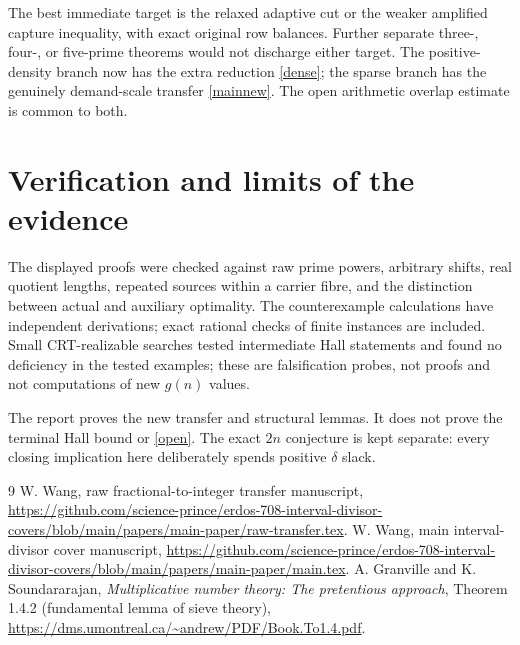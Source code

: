 \documentclass[11pt,a4paper]{article}
\begin{document}
The best immediate target is the relaxed adaptive cut or the weaker
amplified capture inequality, with exact original row balances. Further
separate three-, four-, or five-prime theorems would not discharge either
target. The positive-density branch now has the extra reduction
\eqref{dense}; the sparse branch has the genuinely demand-scale transfer
\eqref{mainnew}. The open arithmetic overlap estimate is common to both.

\section{Verification and limits of the evidence}

The displayed proofs were checked against raw prime powers, arbitrary shifts,
real quotient lengths, repeated sources within a carrier fibre, and the
distinction between actual and auxiliary optimality. The counterexample
calculations have independent derivations; exact rational checks of finite
instances are included. Small CRT-realizable searches tested intermediate
Hall statements and found no deficiency in the tested examples; these are
falsification probes, not proofs and not computations of new $g(n)$ values.

The report proves the new transfer and structural lemmas. It does not prove
the terminal Hall bound or \eqref{open}. The exact $2n$ conjecture is kept
separate: every closing implication here deliberately spends positive
$\delta$ slack.

\begin{thebibliography}{9}
 W. Wang, raw fractional-to-integer transfer manuscript,
\url{https://github.com/science-prince/erdos-708-interval-divisor-covers/blob/main/papers/main-paper/raw-transfer.tex}.
 W. Wang, main interval-divisor cover manuscript,
\url{https://github.com/science-prince/erdos-708-interval-divisor-covers/blob/main/papers/main-paper/main.tex}.
 A. Granville and K. Soundararajan,
\emph{Multiplicative number theory: The pretentious approach},
Theorem 1.4.2 (fundamental lemma of sieve theory),
\url{https://dms.umontreal.ca/~andrew/PDF/Book.To1.4.pdf}.
\end{thebibliography}
\end{document}
